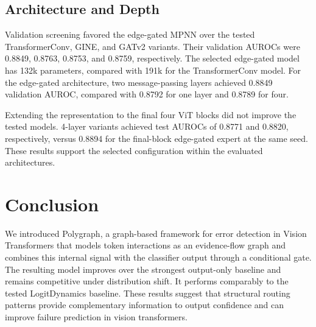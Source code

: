 \documentclass[11pt]{article}
\begin{document}

\subsection{Architecture and Depth}
Validation screening favored the edge-gated MPNN over the tested  TransformerConv, GINE, and GATv2 variants. Their validation AUROCs were 0.8849, 0.8763, 0.8753, and 0.8759,
respectively. The selected edge-gated model has 132k parameters,
compared with 191k for the TransformerConv model.
For the edge-gated architecture, two message-passing layers
achieved 0.8849 validation AUROC, compared with 0.8792 for one
layer and 0.8789 for four.

Extending the representation to the final four ViT blocks did
not improve the tested models. 4-layer variants achieved test AUROCs of 0.8771 and 0.8820,
respectively, versus 0.8894 for the final-block edge-gated expert
at the same seed. These results support the selected configuration within the evaluated
architectures.

\section{Conclusion}

We introduced Polygraph, a graph-based framework for error detection in Vision Transformers that models token interactions as an evidence-flow graph and combines this internal signal with the classifier output through a conditional gate. The resulting model improves over the strongest output-only baseline and remains competitive under distribution shift. It performs comparably to the tested LogitDynamics baseline. These results suggest that structural routing patterns provide complementary information to output confidence and can improve failure prediction in vision transformers.


\end{document}
